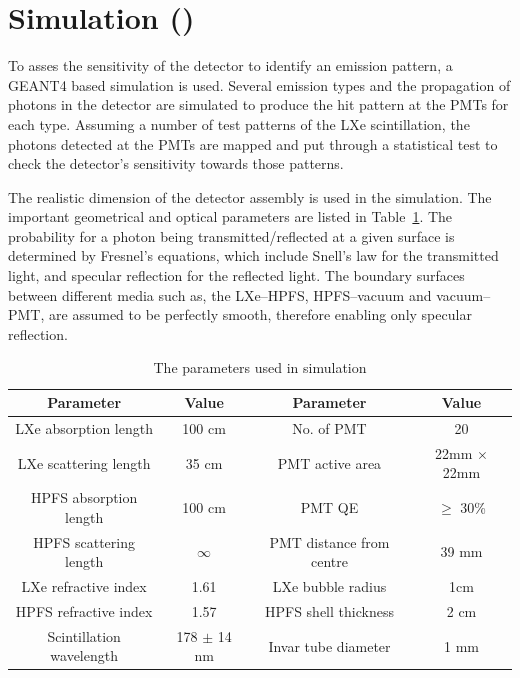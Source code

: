 \section{Simulation ()}
\label{sec:sim}
To asses the sensitivity of the detector to identify an emission pattern, a GEANT4 based simulation is used. 
Several emission types and the propagation of photons in the detector are simulated to produce the hit pattern  
at the PMTs for each type. 
Assuming a number of test patterns of the LXe scintillation, the photons detected at the PMTs are mapped and put 
through a statistical test to check the detector's sensitivity towards those patterns.

The realistic dimension of the detector assembly is used in the simulation. The important 
geometrical and optical parameters are listed in Table~\ref{tab:OptPar}. 
The probability for a photon being transmitted/reflected at a given surface is 
determined by Fresnel's equations, which include Snell's law for the transmitted light, 
and specular reflection for the reflected light. The boundary surfaces between different media
such as, the LXe--HPFS, HPFS--vacuum and vacuum--PMT, are assumed to be perfectly smooth, 
therefore enabling only specular reflection.

\begin{table}[h]
  \centering
  \caption{The parameters used in simulation}
  \label{tab:OptPar}
  \begin{tabular}{|c c||c c|}
  \hline
  Parameter & Value & Parameter & Value \\
  \hline
  LXe absorption length & 100 cm & No. of PMT & 20\\
  LXe scattering length & 35 cm & PMT active area & 22mm $\times$ 22mm\\
  HPFS absorption length & 100 cm & PMT QE & $\geq$ 30\% \\
  HPFS scattering length & $\infty$ & PMT distance from centre & 39 mm\\
  LXe refractive index & 1.61 & LXe bubble radius & 1cm\\
  HPFS refractive index & 1.57 & HPFS shell thickness & 2 cm \\
  Scintillation wavelength & 178 $\pm$ 14 nm & Invar tube diameter & 1 mm\\
  \hline
 \end{tabular}
\end{table}

